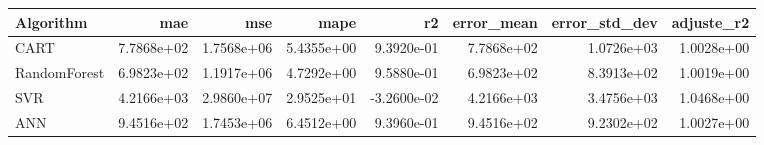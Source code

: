 \begin{tabular}{lrrrrrrr}
\toprule
Algorithm & mae & mse & mape & r2 & error_mean & error_std_dev & adjuste_r2 \\
\midrule
CART & 7.7868e+02 & 1.7568e+06 & 5.4355e+00 & 9.3920e-01 & 7.7868e+02 & 1.0726e+03 & 1.0028e+00 \\
RandomForest & 6.9823e+02 & 1.1917e+06 & 4.7292e+00 & 9.5880e-01 & 6.9823e+02 & 8.3913e+02 & 1.0019e+00 \\
SVR & 4.2166e+03 & 2.9860e+07 & 2.9525e+01 & -3.2600e-02 & 4.2166e+03 & 3.4756e+03 & 1.0468e+00 \\
ANN & 9.4516e+02 & 1.7453e+06 & 6.4512e+00 & 9.3960e-01 & 9.4516e+02 & 9.2302e+02 & 1.0027e+00 \\
\bottomrule
\end{tabular}
